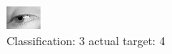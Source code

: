\begin{figure}[h!]
\begin{center}
\includegraphics[width=0.60\columnwidth]{figures/ID3041_class_3_target_4.png}
\end{center}
\caption{ Classification: 3 actual target: 4}
\label{fig:ID3041_class_3_target_4}
\end{figure}
